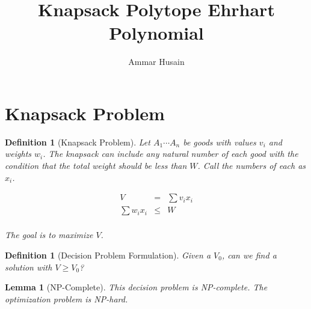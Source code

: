 \documentclass[11pt]{article}
\title{Knapsack Polytope Ehrhart Polynomial}
\author{Ammar Husain}
\theoremstyle{change}
\newtheorem{definition}[equation]{Definition}
\newtheorem{lemma}[equation]{Lemma}
\theoremstyle{nonumberplain}
\numberwithin{equation}{section}
\begin{document}
\section{Knapsack Problem}

\begin{definition}[Knapsack Problem]
Let $A_1 \cdots A_n$ be goods with values $v_i$ and weights $w_i$. The knapsack can include any natural number of each good with the condition that the total weight should be less than $W$. Call the numbers of each as $x_i$.

\begin{eqnarray*}
V &=& \sum v_i x_i\\
\sum w_i x_i &\leq& W\\
\end{eqnarray*}

The goal is to maximize $V$.

\end{definition}

\begin{definition}[Decision Problem Formulation]
Given a $V_0$, can we find a solution with $V \geq V_0$?
\end{definition}

\begin{lemma}[NP-Complete]
This decision problem is NP-complete. The optimization problem is NP-hard.
\end{lemma}
\end{document}

